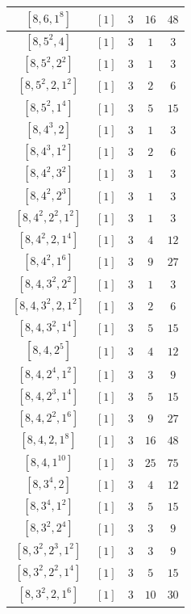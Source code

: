 \documentclass{article}%
\begin{document}
\begin{center}
\begin{longtable}{||c|c|c|c|c||}
$[8, 6, 1^{8}]$ & $[1]$ & $3$ & $16$ & $48$ \\ \hline 
$[8, 5^{2}, 4]$ & $[1]$ & $3$ & $1$ & $3$ \\ \hline 
$[8, 5^{2}, 2^{2}]$ & $[1]$ & $3$ & $1$ & $3$ \\ \hline 
$[8, 5^{2}, 2, 1^{2}]$ & $[1]$ & $3$ & $2$ & $6$ \\ \hline 
$[8, 5^{2}, 1^{4}]$ & $[1]$ & $3$ & $5$ & $15$ \\ \hline 
$[8, 4^{3}, 2]$ & $[1]$ & $3$ & $1$ & $3$ \\ \hline 
$[8, 4^{3}, 1^{2}]$ & $[1]$ & $3$ & $2$ & $6$ \\ \hline 
$[8, 4^{2}, 3^{2}]$ & $[1]$ & $3$ & $1$ & $3$ \\ \hline 
$[8, 4^{2}, 2^{3}]$ & $[1]$ & $3$ & $1$ & $3$ \\ \hline 
$[8, 4^{2}, 2^{2}, 1^{2}]$ & $[1]$ & $3$ & $1$ & $3$ \\ \hline 
$[8, 4^{2}, 2, 1^{4}]$ & $[1]$ & $3$ & $4$ & $12$ \\ \hline 
$[8, 4^{2}, 1^{6}]$ & $[1]$ & $3$ & $9$ & $27$ \\ \hline 
$[8, 4, 3^{2}, 2^{2}]$ & $[1]$ & $3$ & $1$ & $3$ \\ \hline 
$[8, 4, 3^{2}, 2, 1^{2}]$ & $[1]$ & $3$ & $2$ & $6$ \\ \hline 
$[8, 4, 3^{2}, 1^{4}]$ & $[1]$ & $3$ & $5$ & $15$ \\ \hline 
$[8, 4, 2^{5}]$ & $[1]$ & $3$ & $4$ & $12$ \\ \hline 
$[8, 4, 2^{4}, 1^{2}]$ & $[1]$ & $3$ & $3$ & $9$ \\ \hline 
$[8, 4, 2^{3}, 1^{4}]$ & $[1]$ & $3$ & $5$ & $15$ \\ \hline 
$[8, 4, 2^{2}, 1^{6}]$ & $[1]$ & $3$ & $9$ & $27$ \\ \hline 
$[8, 4, 2, 1^{8}]$ & $[1]$ & $3$ & $16$ & $48$ \\ \hline 
$[8, 4, 1^{10}]$ & $[1]$ & $3$ & $25$ & $75$ \\ \hline 
$[8, 3^{4}, 2]$ & $[1]$ & $3$ & $4$ & $12$ \\ \hline 
$[8, 3^{4}, 1^{2}]$ & $[1]$ & $3$ & $5$ & $15$ \\ \hline 
$[8, 3^{2}, 2^{4}]$ & $[1]$ & $3$ & $3$ & $9$ \\ \hline 
$[8, 3^{2}, 2^{3}, 1^{2}]$ & $[1]$ & $3$ & $3$ & $9$ \\ \hline 
$[8, 3^{2}, 2^{2}, 1^{4}]$ & $[1]$ & $3$ & $5$ & $15$ \\ \hline 
$[8, 3^{2}, 2, 1^{6}]$ & $[1]$ & $3$ & $10$ & $30$ \\ \hline 

\end{longtable}
\end{center}
\end{document}
